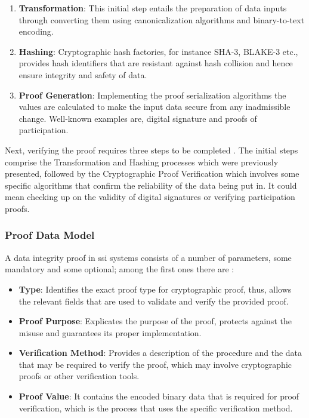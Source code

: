 \begin{enumerate}
  \item \textbf{Transformation}: This initial step entails the preparation of data inputs through converting them using canonicalization algorithms and binary-to-text encoding.
  \item \textbf{Hashing}: Cryptographic hash factories, for instance SHA-3, BLAKE-3 etc., provides hash identifiers that are resistant against hash collision and hence 
  ensure integrity and safety of data.
  \item \textbf{Proof Generation}: Implementing the proof serialization algorithms the values are calculated to make the input data secure from any inadmissible change. 
  Well-known examples are, digital signature and proofs of participation.
\end{enumerate}

Next, verifying the proof requires three steps to be completed \cite{VCDataIntegrity}. The initial steps comprise the Transformation and Hashing processes which were previously presented, 
followed by the Cryptographic Proof Verification which involves some specific algorithms that confirm the reliability of the data being put in. It could mean checking up 
on the validity of digital signatures or verifying participation proofs.

\subsubsection{Proof Data Model}

A data integrity proof in \gls{ssi} systems consists of a number of parameters, some mandatory and some optional; among the first ones there are \cite{VCDataIntegrity}: 

\begin{itemize}
  \item \textbf{Type}: Identifies the exact proof type for cryptographic proof, thus, allows the relevant fields that are used to validate and verify the provided proof.
  \item \textbf{Proof Purpose}: Explicates the purpose of the proof, protects against the misuse and guarantees its proper implementation.
  \item \textbf{Verification Method}: Provides a description of the procedure and the data that may be required to verify the proof, which may involve cryptographic proofs 
  or other verification tools.
  \item \textbf{Proof Value}: It contains the encoded binary data that is required for proof verification, which is the process that uses the specific verification method.
\end{itemize}

